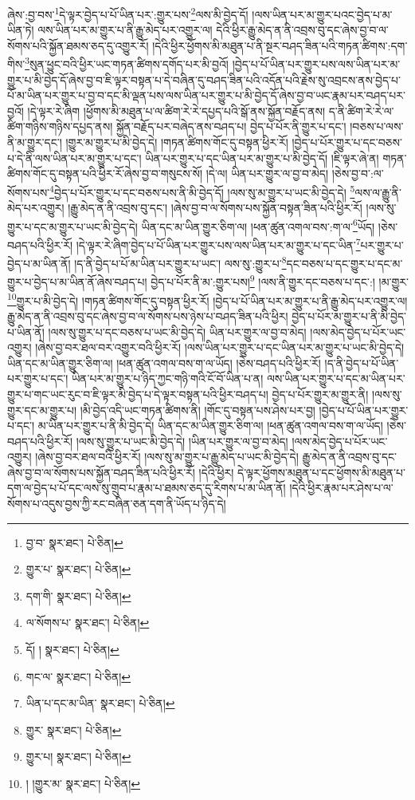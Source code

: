 ཞེས་:བྱ་བས་\footnote{བྱ་བ་  སྣར་ཐང་།  པེ་ཅིན། }དེ་ལྟར་བྱེད་པ་པོ་ཡིན་པར་:གྱུར་པས་\footnote{གྱུར་པ་  སྣར་ཐང་།  པེ་ཅིན། }ལས་མི་བྱེད་དོ། །ལས་ཡིན་པར་མ་གྱུར་པའང་བྱེད་པ་མ་ཡིན་ཏེ། ལས་ཡིན་པར་མ་གྱུར་པ་ནི་རྒྱུ་མེད་པར་འགྱུར་ལ། དེའི་ཕྱིར་རྒྱུ་མེད་ན་ནི་འབྲས་བུ་དང་ཞེས་བྱ་བ་ལ་སོགས་པའི་སྐྱོན་ཐམས་ཅད་དུ་འགྱུར་རོ། །དེའི་ཕྱིར་ཕྱོགས་མི་མཐུན་པ་ནི་སྔར་བཤད་ཟིན་པའི་གཏན་ཚིགས་:དག་གིས་\footnote{དག་གི་  སྣར་ཐང་།  པེ་ཅིན། }སུན་ཕྱུང་བའི་ཕྱིར་ཡང་གཏན་ཚིགས་དགོད་པར་མི་བྱའོ། །བྱེད་པ་པོ་ཡིན་པར་གྱུར་པས་ལས་ཡིན་པར་མ་གྱུར་པ་མི་བྱེད་དོ་ཞེས་བྱ་བ་ཇི་ལྟར་བསྟན་པ་དེ་བཞིན་དུ་བཤད་ཟིན་པའི་འདོན་པའི་རྗེས་སུ་འབྲངས་ནས་བྱེད་པ་པོ་མ་ཡིན་པར་གྱུར་པ་བྱ་བ་དང་མི་ལྡན་པས་ལས་ཡིན་པར་གྱུར་པ་མི་བྱེད་དོ་ཞེས་བྱ་བ་ཡང་རྣམ་པར་བཤད་པར་བྱའོ། །དེ་ལྟར་རེ་ཞིག །ཕྱོགས་མི་མཐུན་པ་ལ་ཚིག་རེ་རེ་དཔྱད་པའི་སྒོ་ནས་སྐྱོན་བརྗོད་ནས། ད་ནི་ཚིག་རེ་རེ་ལ་ཚིག་གཉིས་གཉིས་དཔྱད་ནས། སྐྱོན་བརྗོད་པར་བཞེད་ནས་བཤད་པ། བྱེད་པ་པོར་ནི་གྱུར་པ་དང་། །བཅས་པ་ལས་ནི་མ་གྱུར་དང་། །གྱུར་མ་གྱུར་པ་མི་བྱེད་དེ། །གཏན་ཚིགས་གོང་དུ་བསྟན་ཕྱིར་རོ། །བྱེད་པ་པོར་གྱུར་པ་དང་བཅས་པ་དེ་ནི་ལས་ཡིན་པར་མ་གྱུར་པ་དང་། ཡིན་པར་གྱུར་པ་དང་ཡིན་པར་མ་གྱུར་པ་མི་བྱེད་དོ། །ཇི་ལྟར་ཞེ་ན། གཏན་ཚིགས་གོང་དུ་བསྟན་པའི་ཕྱིར་རོ་ཞེས་བྱ་བ་གསུངས་སོ། །དེ་ལ། ཡིན་པར་གྱུར་ལ་བྱ་བ་མེད། །ཅེས་བྱ་བ་:ལ་སོགས་པས་\footnote{ལ་སོགས་པ་  སྣར་ཐང་།  པེ་ཅིན། }བྱེད་པ་པོར་གྱུར་པ་དང་བཅས་པས་ནི་མི་བྱེད་དོ། །ལས་སུ་མ་གྱུར་པ་ཡང་མི་བྱེད་དེ། \footnote{དོ། །   སྣར་ཐང་།  པེ་ཅིན། }ལས་ལ་རྒྱུ་ནི་མེད་པར་འགྱུར། །རྒྱུ་མེད་ན་ནི་འབྲས་བུ་དང་། །ཞེས་བྱ་བ་ལ་སོགས་པས་སྐྱོན་བསྟན་ཟིན་པའི་ཕྱིར་རོ། །ལས་སུ་གྱུར་པ་དང་མ་གྱུར་པ་ཡང་མི་བྱེད་དེ། ཡིན་དང་མ་ཡིན་གྱུར་ཅིག་ལ། །ཕན་ཚུན་འགལ་བས་:ག་ལ་\footnote{གང་ལ་  སྣར་ཐང་།  པེ་ཅིན། }ཡོད། །ཅེས་བཤད་པའི་ཕྱིར་རོ། །དེ་ལྟར་རེ་ཞིག་བྱེད་པ་པོ་ཡིན་པར་གྱུར་པས་ལས་ཡིན་པར་མ་གྱུར་པ་དང་ཡིན་\footnote{ཡིན་པ་དང་མ་ཡིན་  སྣར་ཐང་།  པེ་ཅིན། }པར་གྱུར་པ་བྱེད་པ་མ་ཡིན་ནོ། །ད་ནི་བྱེད་པ་པོ་མ་ཡིན་པར་གྱུར་པ་ཡང་། ལས་སུ་:གྱུར་པ་\footnote{གྱུར་  སྣར་ཐང་།  པེ་ཅིན། }དང་བཅས་པ་དང་གྱུར་པ་དང་མ་གྱུར་པ་བྱེད་པ་མ་ཡིན་ནོ་ཞེས་བཤད་པ། བྱེད་པ་པོར་ནི་མ་:གྱུར་པས།\footnote{གྱུར་པ།  སྣར་ཐང་།  པེ་ཅིན། } །ལས་ནི་གྱུར་དང་བཅས་པ་དང་:། །མ་གྱུར་\footnote{། །གྱུར་མ་  སྣར་ཐང་།  པེ་ཅིན། }གྱུར་པ་མི་བྱེད་དེ། །གཏན་ཚིགས་གོང་དུ་བསྟན་ཕྱིར་རོ། །བྱེད་པ་པོ་ཡིན་པར་མ་གྱུར་པ་ནི་རྒྱུ་མེད་པར་འགྱུར་ལ། རྒྱུ་མེད་ན་ནི་འབྲས་བུ་དང་ཞེས་བྱ་བ་ལ་སོགས་པས་ཉེས་པ་བཤད་ཟིན་པའི་ཕྱིར། བྱེད་པ་པོར་མ་གྱུར་པ་ནི་མི་བྱེད་པ་ཡིན་ནོ། །ལས་སུ་གྱུར་པ་དང་བཅས་པ་ཡང་མི་བྱེད་དེ། ཡིན་པར་གྱུར་ལ་བྱ་བ་མེད། །ལས་མེད་བྱེད་པ་པོར་ཡང་འགྱུར། །ཞེས་བྱ་བར་ཐལ་བར་འགྱུར་བའི་ཕྱིར་རོ། །ལས་ཡིན་པར་གྱུར་པ་དང་ཡིན་པར་མ་གྱུར་པ་ཡང་མི་བྱེད་དེ། ཡིན་དང་མ་ཡིན་གྱུར་ཅིག་ལ། །ཕན་ཚུན་འགལ་བས་ག་ལ་ཡོད། །ཅེས་བཤད་པའི་ཕྱིར་རོ། །ད་ནི་བྱེད་པ་པོ་ཡིན་པར་གྱུར་པ་དང་། ཡིན་པར་མ་གྱུར་པ་ཉིད་ཀྱང་གཉི་གའི་ངོ་བོ་ཡིན་པ་ན། ལས་ཡིན་པར་གྱུར་པ་དང་མ་ཡིན་པར་གྱུར་པ་གང་ཡང་རུང་བ་ཇི་ལྟར་མི་བྱེད་པ་དེ་ལྟར་བསྟན་པའི་ཕྱིར་བཤད་པ། བྱེད་པ་པོར་གྱུར་མ་གྱུར་ནི། །ལས་སུ་གྱུར་དང་མ་གྱུར་པ། །མི་བྱེད་འདི་ཡང་གཏན་ཚིགས་ནི། །གོང་དུ་བསྟན་པས་ཤེས་པར་བྱ། །བྱེད་པ་པོ་ཡིན་པར་གྱུར་པ་དང་། མ་ཡིན་པར་གྱུར་པ་ནི་མི་བྱེད་དེ། ཡིན་དང་མ་ཡིན་གྱུར་ཅིག་ལ། །ཕན་ཚུན་འགལ་བས་ག་ལ་ཡོད། །ཅེས་བཤད་པའི་ཕྱིར་རོ། །ལས་སུ་གྱུར་པ་ཡང་མི་བྱེད་དེ། །ཡིན་པར་གྱུར་ལ་བྱ་བ་མེད། །ལས་མེད་བྱེད་པ་པོར་ཡང་འགྱུར། །ཞེས་བྱ་བར་ཐལ་བའི་ཕྱིར་རོ། །ལས་སུ་མ་གྱུར་པ་རྒྱུ་མེད་པ་ཡང་མི་བྱེད་དེ། རྒྱུ་མེད་ན་ནི་འབྲས་བུ་དང་ཞེས་བྱ་བ་ལ་སོགས་པས་སྐྱོན་བཤད་ཟིན་པའི་ཕྱིར་རོ། །དེའི་ཕྱིར། དེ་ལྟར་ཕྱོགས་མཐུན་པ་དང་ཕྱོགས་མི་མཐུན་པ་དག་ལ་བྱེད་པ་པོ་དང་ལས་སུ་གྲུབ་པ་རྣམ་པ་ཐམས་ཅད་དུ་རིགས་པ་མ་ཡིན་ནོ། །དེའི་ཕྱིར་རྣམ་པར་ཤེས་པ་ལ་སོགས་པ་འདུས་བྱས་ཀྱི་རང་བཞིན་ཅན་དག་ནི་ཡོད་པ་ཉིད་དེ། 